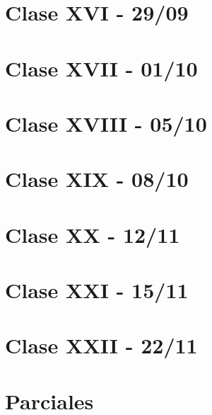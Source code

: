 \documentclass[12pt,a4paper]{book}
\begin{document}
\chapter{Clase XVI - 29/09}


\chapter{Clase XVII - 01/10}


\chapter{Clase XVIII - 05/10}


\chapter{Clase XIX - 08/10}


\chapter{Clase XX - 12/11}


\chapter{Clase XXI - 15/11}


\chapter{Clase XXII - 22/11}


\chapter{Parciales}


\blankpage



\nocite{*}
\end{document}
